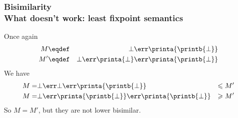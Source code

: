 \documentclass{beamer}
\newcommand{\green}[1]{\textcolor{green}{#1}}
\begin{document}
\begin{frame}\frametitle{Bisimilarity \\ What doesn't work: least fixpoint semantics}
  
Once again
\begin{eqnarray*}
  M & \eqdef & \bot \err \printa{\printb{\bot}} \\
  M' & \eqdef & \bot \err \printa{\bot} \err \printa{\printb{\bot}}
\end{eqnarray*}
We have
\begin{eqnarray*}
  M = & \bot \err \bot \err \printa{\printb{\bot}} & \leqslant M' \\
 M = & \bot \err \printa{\printb{\bot}} \err \printa{\printb{\bot}} & \geqslant M'
\end{eqnarray*}
So $M=M'$, but they are not lower bisimilar.







\medskip



\end{frame}
\end{document}
